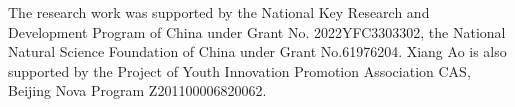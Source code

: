 \begin{acks}

The research work was supported by the National Key Research and Development Program of China under Grant No. 2022YFC3303302, the National Natural Science Foundation of China under Grant No.61976204. Xiang Ao is also supported by the Project of Youth Innovation Promotion Association CAS, Beijing Nova Program Z201100006820062.

\end{acks}
